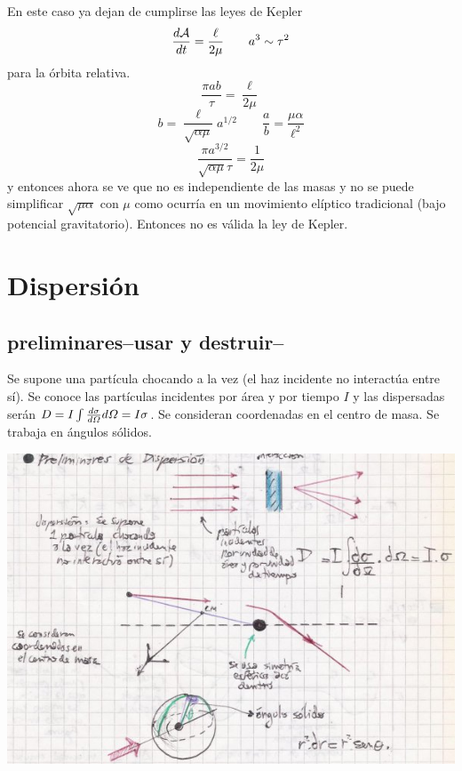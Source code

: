 \documentclass[10pt,oneside]{CBFT_book}
\begin{document}
En este caso ya dejan de cumplirse las leyes de Kepler
\[
	\frac{d^{\hspace{-0.05em}} {\mathcal{A}}}{d {t}^{\hspace{-0.05em}}} = \frac{\ell}{2\mu} \qquad a^3 \sim \tau^2 
\]
para la órbita relativa.
\[
	\frac{\pi a b }{\tau}= \frac{\ell}{2\mu} 
\]
\[
	b = \frac{\ell}{\sqrt{\alpha \mu}} a^{1/2} \qquad \frac{a}{b} = \frac{\mu \alpha}{\ell^2}
\]
\[
	\frac{\pi a^{3/2}}{\sqrt{\alpha \mu} \tau} = \frac{1}{2\mu}
\]
y entonces ahora se ve que no es independiente de las masas y no se puede simplificar $\sqrt{\mu\alpha}$ con
$\mu$ como ocurría en un movimiento elíptico tradicional (bajo potencial gravitatorio).
Entonces no es válida la ley de Kepler.

\section{Dispersión}

\subsection{preliminares--usar y destruir--}

Se supone una partícula chocando a la vez (el haz incidente no interactúa entre sí).
Se conoce las partículas incidentes por área y por tiempo $I$ y las dispersadas serán
$ D = I \int \frac{d^{\hspace{-0.05em}} {\sigma}}{d {\Omega}^{\hspace{-0.05em}}} d\Omega = I \sigma$.
Se consideran coordenadas en el centro de masa.
Se trabaja en ángulos sólidos.

\includegraphics[scale=0.3]{images/fig_mc_dispersion_varios.jpg}
\end{document}
